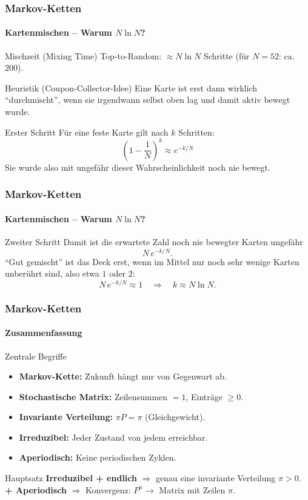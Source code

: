 \documentclass{beamer}
\begin{document}
\begin{frame}
    \frametitle{Markov-Ketten}
\framesubtitle{Kartenmischen -- Warum $N\ln N$?}
    \begin{block}{Mischzeit (Mixing Time)}
Top-to-Random: $\approx N \ln N$ Schritte (für $N=52$: ca.\ $200$).
\end{block}
    \begin{block}{Heuristik (Coupon-Collector-Idee)}
Eine Karte ist erst dann wirklich ``durchmischt'', wenn sie irgendwann selbst oben lag und damit aktiv bewegt wurde.
\end{block}
\begin{block}{Erster Schritt}
Für eine feste Karte gilt nach $k$ Schritten:
\[
\left(1-\frac{1}{N}\right)^k \approx e^{-k/N}
\]
Sie wurde also mit ungefähr dieser Wahrscheinlichkeit noch nie bewegt.
\end{block}
 \end{frame}


\begin{frame}
    \frametitle{Markov-Ketten}
\framesubtitle{Kartenmischen -- Warum $N\ln N$?}
    \begin{block}{Zweiter Schritt}
Damit ist die erwartete Zahl noch nie bewegter Karten ungefähr
\[
N\,e^{-k/N}.
\]
    ``Gut gemischt'' ist das Deck erst, wenn im Mittel nur noch sehr wenige Karten unberührt sind,
    also etwa $1$ oder $2$:
\[
N\,e^{-k/N} \approx 1
\quad \Longrightarrow \quad
k \approx N\ln N.
\]
\end{block}
 \end{frame}



\begin{frame}
    \frametitle{Markov-Ketten}
\framesubtitle{Zusammenfassung}
    \begin{block}{Zentrale Begriffe}
\begin{itemize}
\item \textbf{Markov-Kette:} Zukunft hängt nur von Gegenwart ab.
\item \textbf{Stochastische Matrix:} Zeilensummen $= 1$, Einträge $\geq 0$.
\item \textbf{Invariante Verteilung:} $\pi P = \pi$ (Gleichgewicht).
\item \textbf{Irreduzibel:} Jeder Zustand von jedem erreichbar.
\item \textbf{Aperiodisch:} Keine periodischen Zyklen.
\end{itemize}
\end{block}
\begin{block}{Hauptsatz}
\textbf{Irreduzibel + endlich} $\Rightarrow$ genau eine invariante Verteilung $\pi > 0$.\\
\textbf{+ Aperiodisch} $\Rightarrow$ Konvergenz: $P^n \to$ Matrix mit Zeilen $\pi$.
\end{block}
 \end{frame}
\end{document}

